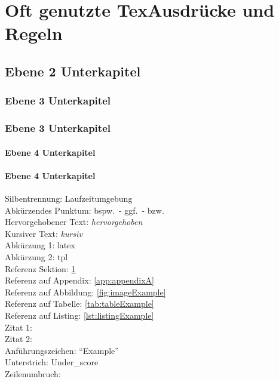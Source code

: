 \section{Oft genutzte TexAusdrücke und Regeln} \label{sec:ebene1Kapitel}
\subsection{Ebene 2 Unterkapitel} \label{sec:ebene2Unterkapitel}
\subsubsection{Ebene 3 Unterkapitel} \label{sec:ebene3Unterkapitel1}
\subsubsection{Ebene 3 Unterkapitel} \label{sec:ebene3Unterkapitel2}
\paragraph{Ebene 4 Unterkapitel} \label{sec:ebene4Unterkapitel1}
\paragraph{Ebene 4 Unterkapitel} \label{sec:ebene4Unterkapitel2}


Silbentrennung:		  	Laufzeitumge\-bung					\\
Abkürzendes Punktum:	bspw.\ - ggf.\ - bzw.\				\\
Hervorgehobener Text:	\emph{hervorgehoben}				\\
Kursiver Text:			\textit{kursiv}						\\
Abkürzung 1:			\gls{latex}							\\
Abkürzung 2:			\gls{tpl}							\\
Referenz Sektion: 		\ref{sec:ebene1Kapitel}				\\
Referenz auf Appendix:	\ref{app:appendixA}					\\
Referenz auf Abbildung: \ref{fig:imageExample}				\\
Referenz auf Tabelle:	\ref{tab:tableExample}				\\
Referenz auf Listing:	\ref{lst:listingExample}			\\
Zitat 1:				\cite[vgl.][]{SAPNetweaverPortal12}	\\
Zitat 2:				\cite[vgl. Seite 5f.]{jsr362}		\\
Anführungszeichen:		"`Example"'							\\
Unterstrich:			Under\_score						\\
Zeilenumbruch:			\\

